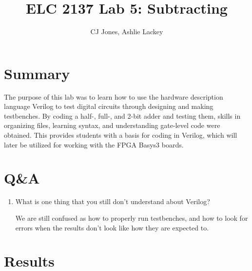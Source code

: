 \documentclass[11pt]{article}
\begin{document}
\title{ELC 2137 Lab 5: Subtracting}
\author{CJ Jones, Ashlie Lackey}

\maketitle


\section*{Summary}

The purpose of this lab was to learn how to use the hardware description language Verilog to test digital circuits through designing and making testbenches. By coding a half-, full-, and 2-bit adder and testing them, skills in organizing files, learning syntax, and understanding gate-level code were obtained. This provides students with a basis for coding in Verilog, which will later be utilized for working with the FPGA Basys3 boards.


\section*{Q\&A}

\begin{enumerate}
	\item What is one thing that you still don’t understand about Verilog?
	
	We are still confused as how to properly run testbenches, and how to look for errors when the results don't look like how they are expected to.
\end{enumerate}




\section*{Results}
\end{document}
